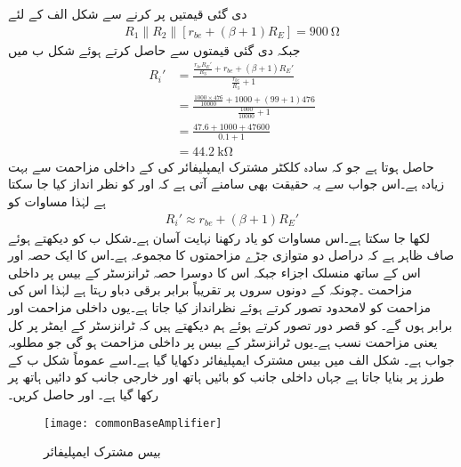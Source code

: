 دی گئی قیمتیں پر کرنے سے شکل  الف  کے لئے
\begin{align*}
R_1 \mathbin{\|} R_2 \mathbin{\|} \left[r_{be}+\left(\beta+1 \right) R_E\right] =\SI{900}{\ohm}
\end{align*}
جبکہ دی گئی قیمتوں سے  حاصل کرتے ہوئے شکل  ب میں 
\begin{align*}
R_i'&=\frac{\frac{r_{be} R_E'}{R_3} +r_{be}+\left(\beta+1\right)R_E' }{\frac{r_{be}}{R_3}+1}\\
&=\frac{\frac{1000\times 476}{10000} +1000+\left(99+1\right)476 }{\frac{1000}{10000}+1}\\
&=\frac{47.6 +1000+47600 }{0.1+1}\\
&=\SI{44.2}{\kilo \ohm}
\end{align*}
حاصل ہوتا ہے جو کہ سادہ کلکٹر  مشترک ایمپلیفائر کی  کے داخلی مزاحمت سے بہت زیادہ ہے۔اس جواب سے یہ حقیقت بھی سامنے آتی ہے کہ  اور  کو نظر انداز کیا جا سکتا ہے لہٰذا مساوات  کو
\begin{align}\label{مساوات_ٹرانزسٹر_کلکٹر _مشترک_زیادہ_داخلی_مزاحمت_الف}
R_i' \approx  r_{be}+\left(\beta+1\right)R_E' 
\end{align}
لکھا جا سکتا ہے۔اس مساوات کو یاد رکھنا نہایت آسان ہے۔شکل  ب کو دیکھتے ہوئے صاف ظاہر ہے کہ  دراصل دو متوازی جڑے مزاحمتوں کا مجموعہ ہے۔اس کا ایک حصہ  اور اس کے ساتھ منسلک اجزاء جبکہ اس کا دوسرا حصہ ٹرانزسٹر کے بیس پر داخلی مزاحمت ۔چونکہ  کے دونوں سروں پر تقریباً برابر برقی دباو رہتا ہے لہٰذا اس کی مزاحمت کو لامحدود تصور کرتے ہوئے نظرانداز کیا جاتا ہے۔یوں داخلی مزاحمت  اور  برابر ہوں گے۔ کو قصر دور تصور کرتے ہوئے ہم دیکھتے ہیں کہ ٹرانزسٹر کے ایمٹر پر کل
  یعنی  مزاحمت نسب ہے۔یوں ٹرانزسٹر کے بیس پر داخلی مزاحمت
  ہو گی جو مطلوبہ جواب ہے۔
شکل  الف میں بیس مشترک ایمپلیفائر دکھایا گیا ہے۔اسے عموماً شکل  ب کے طرز پر بنایا جاتا ہے جہاں داخلی جانب کو بائیں ہاتھ اور خارجی جانب کو دائیں ہاتھ پر رکھا گیا ہے۔ اور  حاصل کریں۔ 
\begin{figure}
\centering
\texttt{[image: commonBaseAmplifier]}
\caption{بیس مشترک ایمپلیفائر}
\label{شکل_ٹرانزسٹر_قابو_مشترک_ایمپلیفائر}
\end{figure}

